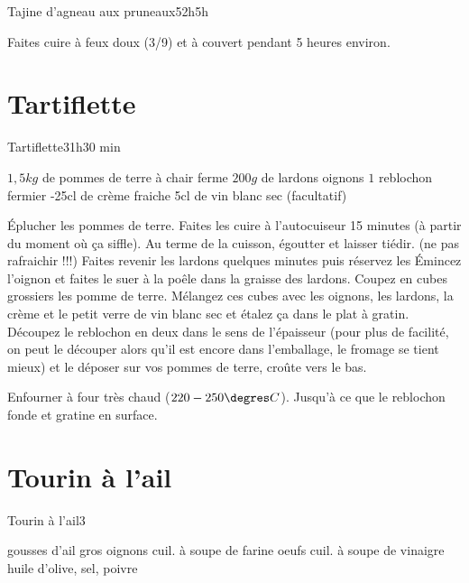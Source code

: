 {\begin{recette}{Tajine d'agneau aux pruneaux}{5}{2h}{5h}
\begin{cuisson}
Faites cuire à feux doux (3/9) et à couvert pendant 5 heures environ.
\end{cuisson}
\end{recette}

\section{Tartiflette}
\begin{recette}{Tartiflette}{3}{1h}{30 min}

\begin{ingredients}
\ingredient $1,5\unit{kg}$ de pommes de terre à chair ferme
\ingredient $200\unit{g}$ de lardons
 oignons
\ingredient $1$ reblochon fermier
-25cl de crème fraiche
\ingredient 5cl de vin blanc sec (facultatif)
\end{ingredients}

\begin{preparation}
\etape Éplucher les pommes de terre. Faites les cuire à l'autocuiseur 15 minutes (à partir du moment où ça siffle).
\etape Au terme de la cuisson, égoutter et laisser tiédir. (ne pas rafraichir !!!)
\etape Faites revenir les lardons quelques minutes puis réservez les
\etape Émincez l'oignon et faites le suer à la poêle dans la graisse des lardons.
\etape Coupez en cubes grossiers les pomme de terre. Mélangez ces cubes avec les oignons, les lardons, la crème et le petit 
verre de vin blanc sec et étalez ça dans le plat à gratin. 
\etape Découpez le reblochon en deux dans le sens de l'épaisseur (pour plus de facilité, on peut le découper alors qu'il est 
encore dans l'emballage, le fromage se tient mieux) et le déposer sur vos pommes de terre, croûte vers le bas.
\end{preparation}

\begin{cuisson}
Enfourner à four très chaud ($220-250\degres C$). Jusqu'à ce que le reblochon fonde et gratine en surface.
\end{cuisson}
\end{recette}

\section{Tourin à l'ail}
\begin{recette}{Tourin à l'ail}{3}{}{}
\begin{ingredients}
 gousses d'ail
 gros oignons
 cuil. à soupe de farine
 oeufs
 cuil. à soupe de vinaigre
\ingredient huile d'olive, sel, poivre
\end{ingredients}


\end{recette}}
